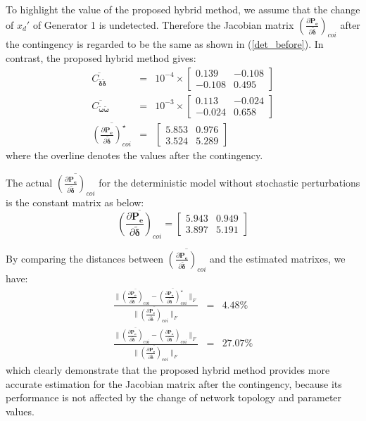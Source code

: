 \documentclass[journal]{IEEEtran}
\begin{document}
To highlight the value of the proposed hybrid method, we assume that the change of $x_d'$ of Generator 1 is undetected. Therefore the Jacobian matrix $(\frac{\partial\bm{P_e}}{\partial\bm{\tilde{\delta}}})_{coi}$ after the contingency is regarded to be the same as shown in (\ref{det_before}). In contrast, the proposed hybrid method gives:
\begin{eqnarray}
\overline{C_{\bm{\tilde{\delta}}{\bm{\tilde{\delta}}}}}&=&10^{-4}\times\left[ \begin{array}{cc}  0.139 & -0.108\\ -0.108 &0.495\end{array}\right]\nonumber\\
\overline{C_{\bm{\tilde{\omega}}{\bm{\tilde{\omega}}}}}&=&10^{-3}\times\left[ \begin{array}{cc}  0.113 & -0.024\\ -0.024 &0.658\end{array}\right]\nonumber\\
\overline{(\frac{\partial\bm{P_e}}{\partial\bm{\tilde{\delta}}})_{coi}^{\star}}&=&\left[ \begin{array}{cc} 5.853 & 0.976\\ 3.524 & 5.289 \end{array}\right]
\end{eqnarray}
where the overline denotes the values after the contingency.

The actual $\overline{(\frac{\partial\bm{P_e}}{\partial\bm{\tilde{\delta}}})_{coi}}$ for the deterministic model without stochastic perturbations is the constant matrix as below:
\begin{equation}
\overline{(\frac{\partial\bm{P_e}}{\partial\bm{\tilde{\delta}}})_{coi}}=\left[ \begin{array}{cc}  5.943 &  0.949\\ 3.897 & 5.191\end{array}\right]
\end{equation}

By comparing the distances between $\overline{(\frac{\partial\bm{P_e}}{\partial\bm{\tilde{\delta}}})_{coi}}$ and the estimated matrixes, we have:
\begin{eqnarray}
\frac{\|\overline{(\frac{\partial\bm{P_e}}{\partial\bm{\tilde{\delta}}})_{coi}}-\overline{(\frac{\partial\bm{P_e}}{\partial\bm{\tilde{\delta}}})_{coi}^{\star}}\|_F}{\|\overline{(\frac{\partial\bm{P_e}}{\partial\bm{\tilde{\delta}}})_{coi}}\|_F}&=&4.48\%\\
\frac{\|\overline{(\frac{\partial\bm{P_e}}{\partial\bm{\tilde{\delta}}})_{coi}}-(\frac{\partial\bm{P_e}}{\partial\bm{\tilde{\delta}}})_{coi}\|_F}{\|\overline{(\frac{\partial\bm{P_e}}{\partial\bm{\tilde{\delta}}})_{coi}}\|_F}&=&27.07\%
\end{eqnarray}
which clearly demonstrate that the proposed hybrid method provides more accurate estimation for the Jacobian matrix after the contingency, because its performance is not affected by the change of network topology and parameter values.
\end{document}
